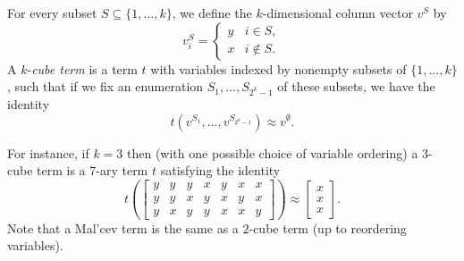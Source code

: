 \documentclass[letterpaper,11pt]{article}
\begin{document}
\begin{defn} For every subset $S \subseteq \{1, ..., k\}$, we define the $k$-dimensional column vector $v^S$ by
\[
v^S_i = \begin{cases} y & i \in S,\\ x & i \not\in S.\end{cases}
\]
A $k$-\emph{cube term} is a term $t$ with variables indexed by nonempty subsets of $\{1, ..., k\}$, such that if we fix an enumeration $S_1, ..., S_{2^k-1}$ of these subsets, we have the identity
\[
t(v^{S_1}, ..., v^{S_{2^k-1}}) \approx v^{\emptyset}.
\]
\end{defn}

For instance, if $k = 3$ then (with one possible choice of variable ordering) a $3$-cube term is a $7$-ary term $t$ satisfying the identity
\[
t\left(\begin{bmatrix} y & y & y & x & y & x & x\\ y & y & x & y & x & y & x\\ y & x & y & y & x & x & y\end{bmatrix}\right) \approx \begin{bmatrix} x\\ x\\ x\end{bmatrix}.
\]
Note that a Mal'cev term is the same as a $2$-cube term (up to reordering variables).
\end{document}

